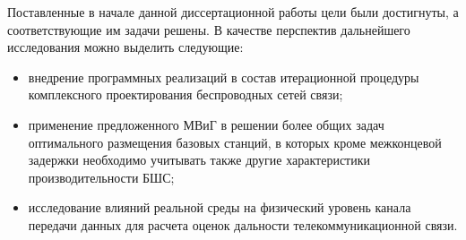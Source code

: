 Поставленные в начале данной диссертационной работы цели были достигнуты, а соответствующие им задачи решены. В качестве перспектив дальнейшего исследования можно выделить следующие:
\begin{itemize}
    \item внедрение программных реализаций в состав итерационной процедуры комплексного проектирования беспроводных сетей связи;
    \item  применение предложенного МВиГ в решении более общих   задач оптимального размещения базовых станций, в которых кроме межконцевой задержки необходимо учитывать также  другие характеристики производительности БШС;
    \item исследование влияний реальной среды на физический уровень канала передачи данных для расчета оценок дальности телекоммуникационной связи.
    
\end{itemize}





% 

